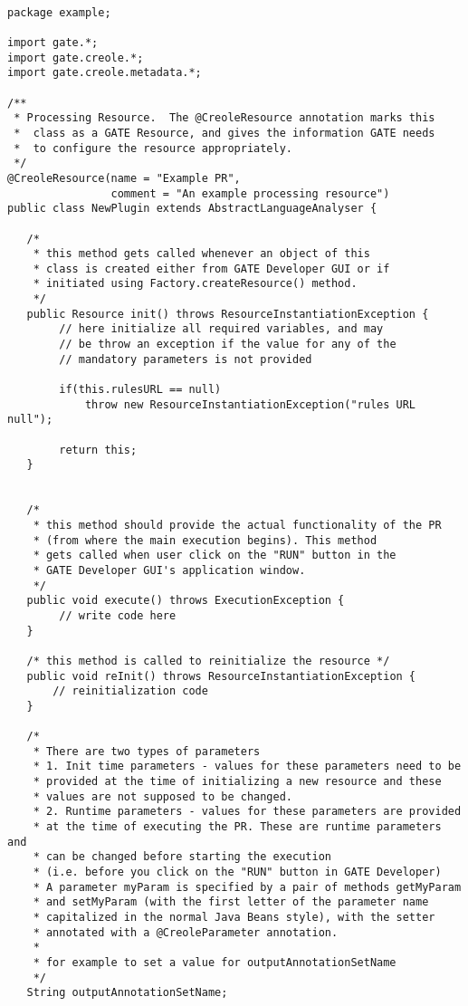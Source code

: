 \begin{lstlisting}

package example;

import gate.*;
import gate.creole.*;
import gate.creole.metadata.*;

/**
 * Processing Resource.  The @CreoleResource annotation marks this
 *  class as a GATE Resource, and gives the information GATE needs
 *  to configure the resource appropriately.
 */
@CreoleResource(name = "Example PR",
                comment = "An example processing resource")
public class NewPlugin extends AbstractLanguageAnalyser {

   /* 
    * this method gets called whenever an object of this
    * class is created either from GATE Developer GUI or if 
    * initiated using Factory.createResource() method.
    */
   public Resource init() throws ResourceInstantiationException {
        // here initialize all required variables, and may
        // be throw an exception if the value for any of the
        // mandatory parameters is not provided

        if(this.rulesURL == null)
            throw new ResourceInstantiationException("rules URL null");

        return this;
   }


   /*
    * this method should provide the actual functionality of the PR
    * (from where the main execution begins). This method 
    * gets called when user click on the "RUN" button in the 
    * GATE Developer GUI's application window.     
    */
   public void execute() throws ExecutionException {
        // write code here
   }

   /* this method is called to reinitialize the resource */
   public void reInit() throws ResourceInstantiationException {
       // reinitialization code
   }

   /*
    * There are two types of parameters
    * 1. Init time parameters - values for these parameters need to be 
    * provided at the time of initializing a new resource and these 
    * values are not supposed to be changed.
    * 2. Runtime parameters - values for these parameters are provided  
    * at the time of executing the PR. These are runtime parameters and
    * can be changed before starting the execution 
    * (i.e. before you click on the "RUN" button in GATE Developer)
    * A parameter myParam is specified by a pair of methods getMyParam
    * and setMyParam (with the first letter of the parameter name
    * capitalized in the normal Java Beans style), with the setter
    * annotated with a @CreoleParameter annotation.
    *
    * for example to set a value for outputAnnotationSetName
    */
   String outputAnnotationSetName;


\end{lstlisting}
